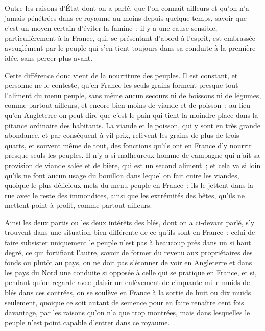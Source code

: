 \documentclass[french,twoside]{book} %
\begin{document}
Outre les raisons d’État dont on a parlé, que l’on connaît ailleurs et qu’on n’a jamais pénétrées dans ce royaume au moins depuis quelque temps, savoir que c’est un moyen certain d’éviter la famine ; il y a une cause sensible, particulièrement à la France, qui, se présentant d’abord à l’esprit, est embrassée aveuglément par le peuple qui s’en tient toujours dans sa conduite à la première idée, sans percer plus avant.\par
Cette différence donc vient de la nourriture des peuples. Il est constant, et personne ne le conteste, qu’en France les seuls grains forment presque tout l’aliment du menu peuple, sans même aucun secours ni de boissons ni de légumes, comme partout ailleurs, et encore bien moins de viande et de poisson ; au lieu qu’en Angleterre on peut dire que c’est le pain qui tient la moindre place dans la pitance ordinaire des habitants. La viande et le poisson, qui y sont en très grande abondance, et par conséquent à vil prix, relèvent les grains de plus de trois quarts, et souvent même de tout, des fonctions qu’ils ont en France d’y nourrir presque seuls les peuples. Il n’y a si malheureux homme de campagne qui n’ait sa provision de viande salée et de bière, qui est un second aliment ; et cela va si loin qu’ils ne font aucun usage du bouillon dans lequel on fait cuire les viandes, quoique le plus délicieux mets du menu peuple en France : ils le jettent dans la rue avec le reste des immondices, ainsi que les extrémités des bêtes, qu’ils ne mettent point à profit, comme partout ailleurs.\par
Ainsi les deux partis ou les deux intérêts des blés, dont on a ci-devant parlé, s’y trouvent dans une situation bien différente de ce qu’ils sont en France : celui de faire subsister uniquement le peuple n’est pas à beaucoup près dans un si haut degré, ce qui fortifiant l’autre, savoir de former du revenu aux propriétaires des fonds ou plutôt au pays, on ne doit pas s’étonner de voir en Angleterre et dans les pays du Nord une conduite si opposée à celle qui se pratique en France, et si, pendant qu’on regarde avec plaisir un enlèvement de cinquante mille muids de blés dans ces contrées, on se soulève en France à la sortie de huit ou dix muids seulement, quoique ce soit autant de semence pour en faire renaître cent fois davantage, par les raisons qu’on n’a que trop montrées, mais dans lesquelles le peuple n’est point capable d’entrer dans ce royaume.\par
\end{document}
